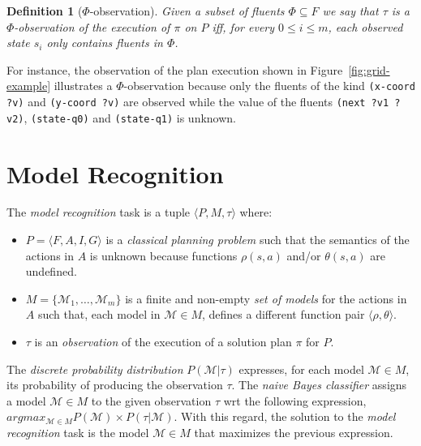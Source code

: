 \documentclass[letterpaper]{article} %
\newcommand{\tup}[1]{{\langle #1 \rangle}}
\newtheorem{definition}[theorem]{Definition}
\begin{document}
\begin{definition}[$\Phi$-observation]
Given a subset of fluents $\Phi\subseteq F$ we say that $\tau$ is a $\Phi$-observation of the execution of $\pi$ on $P$ iff, for every $0\leq i\leq m$, each observed state $s_i$ only contains fluents in $\Phi$.
\end{definition}

For instance, the observation of the plan execution shown in Figure~\ref{fig:grid-example} illustrates a $\Phi$-observation because only the fluents of the kind {\tt\small (x-coord ?v)} and {\tt\small (y-coord ?v)} are observed while the value of the fluents {\tt\small (next ?v1 ?v2)}, {\tt\small (state-q0)} and {\tt\small (state-q1)} is unknown.



\section{Model Recognition}
\label{sec:recognition}
The {\em model recognition} task is a tuple $\tup{P,M,\tau}$ where:
\begin{itemize}
\item $P=\tup{F,A,I,G}$ is a {\em classical planning problem} such that the semantics of the actions in $A$ is unknown because functions $\rho(s,a)$ and/or $\theta(s,a)$ are undefined.
\item $M=\{\mathcal{M}_1,\ldots,\mathcal{M}_m\}$ is a finite and non-empty {\em set of models} for the actions in $A$ such that, each model in $\mathcal{M}\in M$, defines a different function pair $\tup{\rho,\theta}$.
\item $\tau$ is an {\em observation} of the execution of a solution plan $\pi$ for $P$.
\end{itemize}

The {\em discrete probability distribution} $P(\mathcal{M}|\tau)$ expresses, for each model $\mathcal{M}\in M$, its probability of producing the observation $\tau$. The {\em naive Bayes classifier} assigns a model $\mathcal{M}\in M$ to the given observation $\tau$ wrt the following expression, $argmax_{\mathcal{M}\in M} P(\mathcal{M})\times P(\tau|\mathcal{M})$. With this regard, the solution to the {\em model recognition} task is the model $\mathcal{M}\in M$ that maximizes the previous expression.
\end{document}
